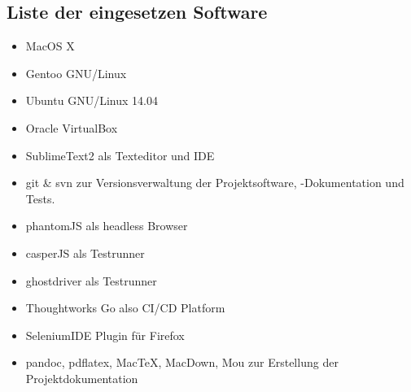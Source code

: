 \subsection{Liste der eingesetzen
Software}\label{liste-der-eingesetzen-software}

\begin{itemize}
\itemsep1pt\parskip0pt
\item
  MacOS X
\item
  Gentoo GNU/Linux
\item
  Ubuntu GNU/Linux 14.04
\item
  Oracle VirtualBox
\item
  SublimeText2 als Texteditor und \acs{IDE}
\item
  git \& svn zur Versionsverwaltung der Projektsoftware, -Dokumentation
  und Tests.
\item
  phantomJS als headless Browser
\item
  casperJS als Testrunner
\item
  ghostdriver als Testrunner
\item
  Thoughtworks Go also CI/CD Platform
\item
  SeleniumIDE Plugin für Firefox
\item
  pandoc, pdflatex, MacTeX, MacDown, Mou zur Erstellung der
  Projektdokumentation
\end{itemize}

% 
% 
% 
% 

% 


% 
